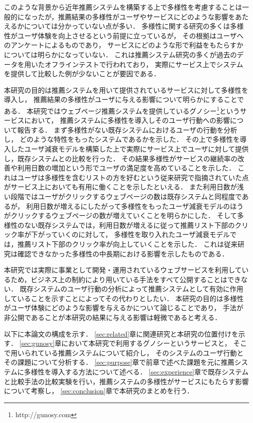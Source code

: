 \documentclass[japanese]{jnlp_1.4}
\begin{document}
このような背景から近年推薦システムを構築する上で多様性を考慮することは一般的になったが，推薦結果の多様性がユーザやサービスにどのような影響をあたえるかについては分かっていない点が多い．
多様性に関する研究の多くは多様性がユーザ体験を向上させるという前提に立っているが，
その根拠はユーザへのアンケートによるものであり，
サービスにどのような形で利益をもたらすかについては明らかになっていない．
これは推薦システム研究の多くが過去のデータを用いたオフラインテストで行われており，
実際にサービス上でシステムを提供して比較した例が少ないことが要因である．

本研究の目的は推薦システムを用いて提供されているサービスに対して多様性を導入し，
推薦結果の多様性がユーザに与える影響について明らかにすることである．
本研究ではウェブページ推薦システムを提供しているグノシー\footnote{http://gunosy.com}というサービスにおいて，
推薦システムに多様性を導入しそのユーザ行動への影響について報告する．
まず多様性がない既存システムにおけるユーザの行動を分析し，
どのような特性をもったシステムであるかを示した．
その上で多様性を導入したユーザ減衰モデルを構築した上で実際にサービス上でユーザに対して提供し，既存システムとの比較を行った．
その結果多様性がサービスの継続率の改善や利用日数の増加という形でユーザの満足度を高めていることを示した．
これはユーザは多様性を含むリストの方を好むという従来研究で指摘されていた点がサービス上においても有用に働くことを示したといえる．
また利用日数が浅い段階ではユーザがクリックするウェブページの数は既存システムと同程度であるが，
利用日数が増えるにしたがって多様性をもったユーザ減衰モデルのほうがクリックするウェブページの数が増えていくことを明らかにした．
そして多様性のない既存システムでは，利用日数が増えるに従って推薦リスト下部のクリック率が下がっていくのに対して，
多様性を取り入れたユーザ減衰モデルでは，推薦リスト下部のクリック率が向上していくことを示した．
これは従来研究は確認できなかった多様性の中長期における影響を示したものである．

本研究では実際に事業として開発・運用されているウェブサービスを利用しているため，ビジネス上の制約により用いている手法をすべて公開することはできない．
既存システムのユーザ行動の分析によって推薦システムとして有効に作用していることを示すことによってその代わりとしたい．
本研究の目的は多様性がユーザ体験にどのような影響を与えるかについて論じることであり，
手法が非公開であることが本研究の結果に与える影響は軽微であると考える．

以下に本論文の構成を示す．
\ref{sec:related}章に関連研究と本研究の位置付けを示す．
\ref{sec:gunosy}章において本研究で利用するグノシーというサービスと，
そこで用いられている推薦システムについて紹介し，
そのシステムのユーザ行動とその課題について分析する．
\ref{sec:purpose}章で前章で述べた課題を元に推薦システムに多様性を導入する方法について述べる．
\ref{sec:experience}章で既存システムと比較手法の比較実験を行い，推薦システムの多様性がサービスにもたらす影響について考察し，
\ref{sec:conclusion}章で本研究のまとめを行う．
\end{document}
